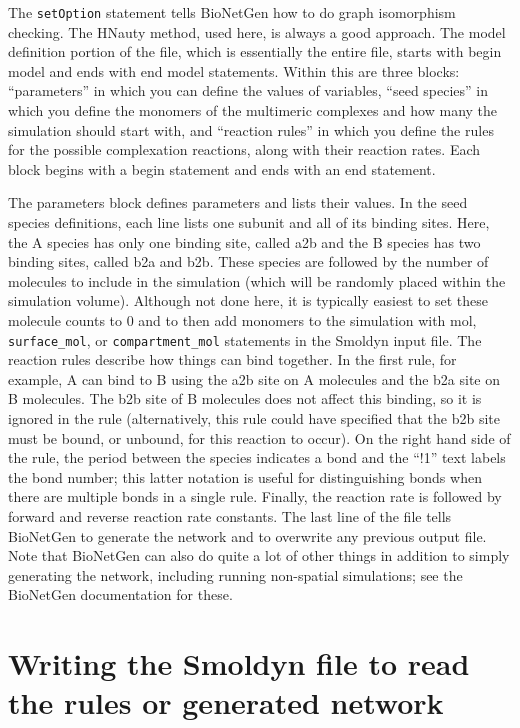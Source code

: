 \documentclass {scrbook}
\newcommand {\ttt} {\texttt}
\begin{document}
The \ttt{setOption} statement tells BioNetGen how to do graph isomorphism checking. The HNauty method, used here, is always a good approach. The model definition portion of the file, which is essentially the entire file, starts with begin model and ends with end model statements. Within this are three blocks: ``parameters'' in which you can define the values of variables, ``seed species'' in which you define the monomers of the multimeric complexes and how many the simulation should start with, and ``reaction rules'' in which you define the rules for the possible complexation reactions, along with their reaction rates. Each block begins with a begin statement and ends with an end statement.

The parameters block defines parameters and lists their values. In the seed species definitions, each line lists one subunit and all of its binding sites. Here, the A species has only one binding site, called a2b and the B species has two binding sites, called b2a and b2b. These species are followed by the number of molecules to include in the simulation (which will be randomly placed within the simulation volume). Although not done here, it is typically easiest to set these molecule counts to 0 and to then add monomers to the simulation with mol, \ttt{surface\_mol}, or \ttt{compartment\_mol} statements in the Smoldyn input file. The reaction rules describe how things can bind together. In the first rule, for example, A can bind to B using the a2b site on A molecules and the b2a site on B molecules. The b2b site of B molecules does not affect this binding, so it is ignored in the rule (alternatively, this rule could have specified that the b2b site must be bound, or unbound, for this reaction to occur). On the right hand side of the rule, the period between the species indicates a bond and the ``!1'' text labels the bond number; this latter notation is useful for distinguishing bonds when there are multiple bonds in a single rule. Finally, the reaction rate is followed by forward and reverse reaction rate constants. The last line of the file tells BioNetGen to generate the network and to overwrite any previous output file. Note that BioNetGen can also do quite a lot of other things in addition to simply generating the network, including running non-spatial simulations; see the BioNetGen documentation for these.

\section{Writing the Smoldyn file to read the rules or generated network}
\end{document}
